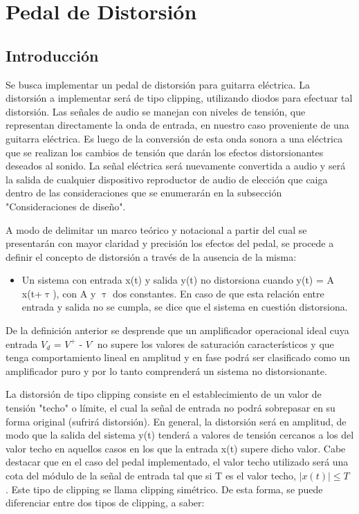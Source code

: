 \documentclass[../../main.tex]{subfiles}
\begin{document}
\section{Pedal de Distorsión}

\subsection{Introducción}

Se busca implementar un pedal de distorsión para guitarra eléctrica. La distorsión a implementar ser\'a de tipo clipping, utilizando diodos para efectuar tal distorsión.
Las señales de audio se manejan con niveles de tensión, que representan directamente la onda de entrada, en nuestro caso proveniente de una guitarra eléctrica. Es luego de la conversión de esta onda sonora a una eléctrica que se realizan los cambios de tensión que darán los efectos distorsionantes deseados al sonido.  La señal eléctrica ser\'a nuevamente convertida a audio y ser\'a la salida de cualquier dispositivo reproductor de audio de elección que caiga dentro de las consideraciones que se enumerarán en la subsección "Consideraciones de dise\~no".  	\par
{}

A modo de delimitar un marco teórico y notacional a partir del cual se presentarán con mayor claridad y precisión los efectos del pedal, se procede a definir el concepto de distorsión a través de la ausencia de la misma: \par

\begin{itemize}
	\item Un sistema con entrada x(t) y salida y(t) no distorsiona cuando y(t) = A x(t+{$\uptau$}), con A y {$\uptau$} dos constantes.  En caso de que esta relación entre entrada y salida no se cumpla, se dice que el sistema en cuestión distorsiona.\par
\end{itemize}

De la definición anterior se desprende que un amplificador operacional ideal cuya entrada $V_d$ = $V^{\text{+}}$ - $V^{\text{-}}$ no supere los valores de saturación característicos y que tenga comportamiento lineal en amplitud y en fase podrá ser clasificado como un amplificador puro y por lo tanto comprenderá un sistema no distorsionante. \par
La distorsión de tipo clipping consiste en el establecimiento de un valor de tensión "techo" o límite, el cual la señal de entrada no podrá sobrepasar en su forma original (sufrirá distorsión). En general, la distorsión será en amplitud, de modo que la salida del sistema y(t) tenderá a valores de tensión cercanos a los del valor techo en aquellos casos en los que la entrada x(t) supere dicho valor. Cabe destacar que en el caso del pedal implementado, el valor techo utilizado será una cota del módulo de la señal de entrada tal que si T es el valor techo,  $|x(t)|\le T$ . Este tipo de clipping se llama clipping simétrico.
De esta forma,  se puede diferenciar entre dos tipos de clipping, a saber:  \par
\end{document}
